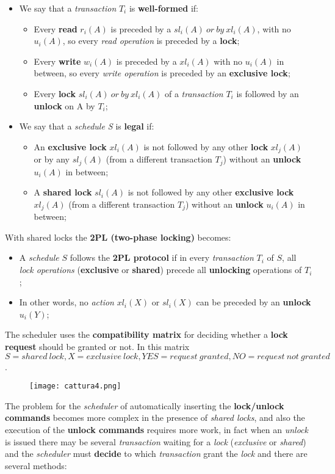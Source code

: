 \documentclass{article}
\begin{document}
\begin{itemize}
\item We say that a \emph{transaction} $T_i$ is \textbf{well-formed} if:
\begin{itemize}
\item Every \textbf{read} $r_i(A)$ is preceded by a $sl_i(A)\ or\ by\ xl_i(A)$, with no $u_i(A)$, so every \emph{read operation} is preceded by a \textbf{lock};
\item Every \textbf{write} $w_i(A)$ is preceded by a $xl_i(A)$ with no $u_i(A)$ in between, so every \emph{write operation} is preceded by an \textbf{exclusive lock};
\item Every \textbf{lock} $sl_i(A)\ or\ by\ xl_i(A)$ of a \emph{transaction} $T_i$ is followed by an \textbf{unlock} on A by $T_i$;
\end{itemize}
\item We say that a \emph{schedule S} is \textbf{legal} if:
\begin{itemize}
\item An \textbf{exclusive lock} $xl_i(A)$ is not followed by any other \textbf{lock} $xl_j(A)$ or by any $sl_j(A)$ (from a different transaction $T_j$) without an \textbf{unlock} $u_i(A)$ in between;
\item A \textbf{shared lock} $sl_i(A)$ is not followed by any other \textbf{exclusive lock} $xl_j(A)$ (from a different transaction $T_j$) without an \textbf{unlock} $u_i(A)$ in between;
\end{itemize}
\end{itemize}
With shared locks the \textbf{2PL (two-phase locking) }becomes:
\begin{itemize}
\item A \emph{schedule} $S$ follows the \textbf{2PL protocol} if in every \emph{transaction} $T_i$ of $S$, all \emph{lock operations} (\textbf{exclusive} or \textbf{shared}) precede all \textbf{unlocking} operations of $T_i$;
\item In other words, no \emph{action} $xl_i(X)$ or $sl_i(X)$ can be preceded by an \textbf{unlock} $u_i(Y)$;
\end{itemize}
The scheduler uses the \textbf{compatibility matrix} for deciding whether a \textbf{lock request} should be granted or not. In this matrix $S = shared\ lock, X = exclusive\ lock, YES = request\ granted, NO = request\ not\ granted$.
\begin{figure}[H]
  \centering
  \texttt{[image: cattura4.png]}
\end{figure}
\clearpage 
The problem for the \emph{scheduler} of automatically inserting the \textbf{lock/unlock commands} becomes more complex in the presence of \emph{shared locks}, and also the execution of the \textbf{unlock commands} requires more work, in fact when an \emph{unlock} is issued there may be several \emph{transaction} waiting for a \emph{lock} (\emph{exclusive} or \emph{shared}) and the \emph{scheduler} must \textbf{decide} to which \emph{transaction} grant the \emph{lock} and there are several methods:
\end{document}
